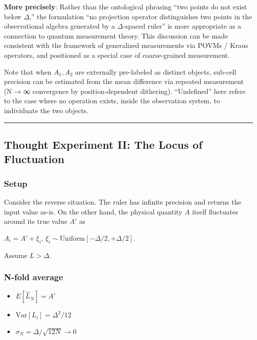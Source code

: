 \documentclass[
]{article}
\providecommand{\tightlist}{%
  \setlength{\itemsep}{0pt}\setlength{\parskip}{0pt}}
\begin{document}
\textbf{More precisely}: Rather than the ontological phrasing ``two
points do not exist below \(\Delta\),'' the formulation ``no projection
operator distinguishes two points in the observational algebra generated
by a \(\Delta\)-spaced ruler'' is more appropriate as a connection to
quantum measurement theory. This discussion can be made consistent with
the framework of generalized measurements via POVMs / Kraus operators,
and positioned as a special case of coarse-grained measurement.

Note that when \(A_1, A_2\) are externally pre-labeled as distinct
objects, sub-cell precision can be estimated from the mean difference
via repeated measurement (N → ∞ convergence by position-dependent
dithering). ``Undefined'' here refers to the case where no operation
exists, inside the observation system, to individuate the two objects.

\begin{center}\rule{0.5\linewidth}{0.5pt}\end{center}

\subsection{Thought Experiment II: The Locus of
Fluctuation}\label{thought-experiment-ii-the-locus-of-fluctuation}

\subsubsection{Setup}\label{setup-1}

Consider the reverse situation. The ruler has infinite precision and
returns the input value as-is. On the other hand, the physical quantity
\(A\) itself fluctuates around its true value \(A'\) as

\(A_i = A' + \xi_i\),
\(\xi_i \sim \mathrm{Uniform}[-\Delta/2, +\Delta/2]\).

Assume \(L > \Delta\).

\subsubsection{N-fold average}\label{n-fold-average}

\begin{itemize}
\tightlist
\item
  \(E[\hat{L}_N] = A'\)
\item
  \(\mathrm{Var}[L_i] = \Delta^2/12\)
\item
  \(\sigma_N = \Delta/\sqrt{12N} \to 0\)
\end{itemize}
\end{document}
